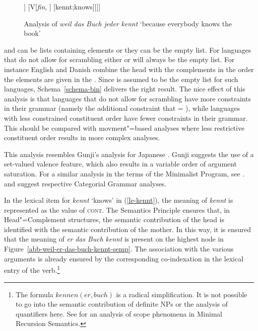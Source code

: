 {\begin{figure}
\begin{forest}
		[\ibox{1} NP{[\textit{nom}]}
			[jeder;everyone]]
		[V{[\textit{fin}, \comps {}]}
			[kennt;knows]]]]
\end{forest}
\caption{Analysis of \emph{weil das Buch jeder kennt} `because everybody knows the book'}\label{abb-weil-das-buch-jeder-kennt}
\end{figure}
 and  can be lists containing elements or they can be the empty list. For languages
that do not allow for scrambling either  or  will always be the empty list. For
instance English and Danish combine the head with the complements in the order the elements are
given in the \compsl. Since  is assumed to be the empty list for such languages, Schema~\ref{schema-bin} delivers the right result. The nice effect of this analysis is that
languages that do not allow for scrambling have more constraints in their grammar (namely the additional
constraint that  = \eliste), while languages with less constrained constituent order have
fewer constraints in their grammar. This should be compared with movment"=based analyses where less
restrictive constituent order results in more complex analyses.

This analysis resembles Gunji's analysis for Japanese \citeyearpar{Gunji86a}. Gunji suggests the use of a set-valued
valence feature, which also results in a variable order of argument saturation. For a similar analysis in the terms
of the Minimalist Program, see .  \citet[Section~3.1]{Hoffmann95a-u} and
\citet{SB2006a-u} suggest respective Categorial Grammar analyses.

In the lexical item for \emph{kennt} `knows' in (\ref{le-kennt}), the meaning of \emph{kennt} is represented as the
value of \textsc{cont}. The Semantics Principle \citep[]{ps2} ensures that, in Head"=Complement structures, the semantic contribution
of the head is identified with the semantic contribution of the mother. In this way, it is ensured that the meaning of \emph{er das Buch kennt}
is present on the highest node in Figure~\vref{abb-weil-er-das-buch-kennt-semp}. The association with the various arguments is already ensured by
the corresponding co-indexation in the lexical entry of the verb.\footnote{%
		The formula $kennen(er, buch)$ is a radical simplification. It is not possible to go into
		the semantic contribution of definite NPs or the analysis of quantifiers here. See
                 for an analysis of scope phenomena in Minimal Recursion Semantics.%
}


}
